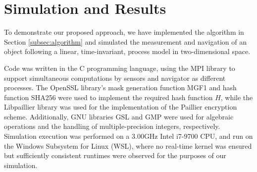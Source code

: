 \documentclass[10pt,journal,compsoc]{IEEEtran}
\theoremstyle{definition}
\theoremstyle{definition}
\theoremstyle{remark}
\begin{document}
\section{Simulation and Results} \label{sec:sim_and_results}
To demonstrate our proposed approach, we have implemented the algorithm in Section \ref{subsec:algorithm} and simulated the measurement and navigation of an object following a linear, time-invariant, process model in two-dimensional space. 

Code was written in the C programming language, using the MPI library \cite{OpenMPI2020} to support simultaneous computations by sensors and navigator as different processes. The OpenSSL library's \cite{OpenSSL2020} mask generation function MGF1 and hash function SHA256 were used to implement the required hash function $H$, while the Libpaillier library \cite{Libpaillier2010} was used for the implementation of the Paillier encryption scheme. Additionally, GNU libraries GSL \cite{GSLGNUScientific2019} and GMP \cite{GMPGNUMultiple2020} were used for algebraic operations and the handling of multiple-precision integers, respectively. Simulation execution was performed on a 3.00GHz Intel i7-9700 CPU, and run on the Windows Subsystem for Linux (WSL), where no real-time kernel was ensured but sufficiently consistent runtimes were observed for the purposes of our simulation.
\end{document}
